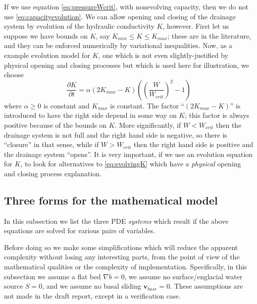\documentclass[11pt]{amsart}
\begin{document}
If we use equation \eqref{eq:pressureWcrit}, with nonevolving capacity, then we do not use \eqref{eq:capacityevolution}.  We can allow opening and closing of the drainage system by evolution of the hydraulic conductivity $K$, however.  First let us suppose we have bounds on $K$, say $K_{min} \le K \le K_{max}$; these are in the literature, and they can be enforced numerically by variational inequalities.  Now, as a example evolution model for $K$, one which is not even slightly-justified by physical opening and closing processes but which is used here for illustration, we choose
\begin{equation}\label{eq:evolvingK}
\frac{\partial K}{\partial t} = \alpha (2 K_{max} - K) \left(\left(\frac{W}{W_{crit}}\right)^2 - 1\right)
\end{equation}
where $\alpha\ge 0$ is constant and $K_{max}$ is constant.    The factor ``$(2K_{max}-K)$'' is introduced to have the right side depend in some way on $K$; this factor is always positive because of the bounds on $K$.  More significantly, if $W<W_{crit}$ then the drainage system is not full and the right hand side is negative, so there is ``closure'' in that sense, while if $W>W_{crit}$ then the right hand side is positive and the drainage system ``opens''.  It is very important, if we use an evolution equation for $K$, to look for alternatives to \eqref{eq:evolvingK} which have a \emph{physical} opening and closing process explanation.


\subsection*{Three forms for the mathematical model}  In this subsection we list the three PDE \emph{systems} which result if the above equations are solved for various pairs of variables.  

Before doing so we make some simplifications which will reduce the apparent complexity without losing any interesting parts, from the point of view of the mathematical qualities or the complexity of implementation.  Specifically, in this subsection we assume a flat bed $\nabla b=0$, we assume no surface/englacial water source $S=0$, and we assume no basal sliding $\mathbf{v}_{base}=0$.  These assumptions are not made in the draft report, except in a verification case.
\end{document}
